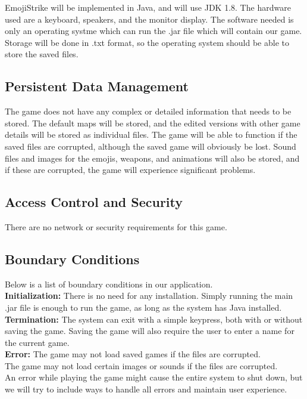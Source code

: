 \documentclass[12pt]{article} %
\begin{document}
EmojiStrike will be implemented in Java, and will use JDK 1.8. The hardware used are a keyboard, speakers, and the monitor display. The software needed is only an operating systme which can run the .jar file which will contain our game. Storage will be done in .txt format, so the operating system should be able to store the saved files.


\subsection{Persistent Data Management} %

The game does not have any complex or detailed information that needs to be stored. The default maps will be stored, and the edited versions with other game details will be stored as individual files. The game will be able to function if the saved files are corrupted, although the saved game will obviously be lost. Sound files and images for the emojis, weapons, and animations will also be stored, and if these are corrupted, the game will experience significant problems.


\subsection{Access Control and  Security} %

There are no network or security requirements for this game.


\subsection{Boundary Conditions} %
Below is a list of boundary conditions in our application.\\
\textbf{Initialization:} There is no need for any installation. Simply running the main .jar file is enough to run the game, as long as the system has Java installed.\\
\textbf{Termination:} The system can exit with a simple keypress, both with or without saving the game. Saving the game will also require the user to enter a name for the current game.\\
\textbf{Error:} The game may not load saved games if the files are corrupted.\\
The game may not load certain images or sounds if the files are corrupted.\\
		An error while playing the game might cause the entire system to shut down, but we will try to include ways to handle all errors and maintain user experience.\\
\end{document}
